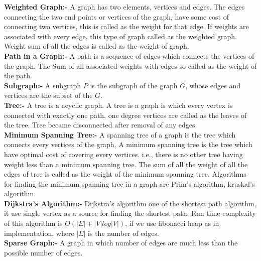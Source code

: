 {\textbf{Weighted Graph:-} A graph has two elements, vertices and edges. The edges connecting the two end points or vertices of the graph, have some cost of connecting two vertices, this is called as the weight for that edge. If weights are associated with every edge, this type of graph called as the weighted graph. Weight sum of all the edges is called as the weight of graph. \\ 
 \textbf{Path in a Graph:-} A path is a sequence of edges which connects the vertices of the graph. The Sum of all associated weights with edges so called as the weight of the path.\\
 \textbf{Subgraph:-} A subgraph $P$ is the subgraph of the graph $G$, whose edges and vertices are the subset of the $G$.\\
 \textbf{Tree:-} A tree is a acyclic graph. A tree is a graph is which every vertex is connected with exactly one path, one degree vertices are called as the leaves of the tree. Tree became disconnected after removal of any edges.\\
 \textbf{Minimum Spanning Tree:-} A spanning tree of a graph is the tree which connects every vertices of the graph, A minimum spanning tree is the tree which have optimal cost of covering every vertices. i.e., there is no other tree having weight less than a minimum spanning tree. The sum of all the weight of all the edges of tree is called as the weight of the minimum spanning tree. Algorithms for finding the minimum spanning tree in a graph are Prim's algorithm, kruskal's algorithm.\\
 \textbf{Dijkstra's Algorithm:-} Dijkstra's algorithm one of the shortest path algorithm, it use single vertex as a source for finding the shortest path. Run time complexity of this algorithm is $O(|E| + |V|log|V|)$, if we use fibonacci heap as in implementation, where $|E|$ is the number of edges.\\
 \textbf{Sparse Graph:-} A graph in which number of edges are much less than the possible number of edges.
}
